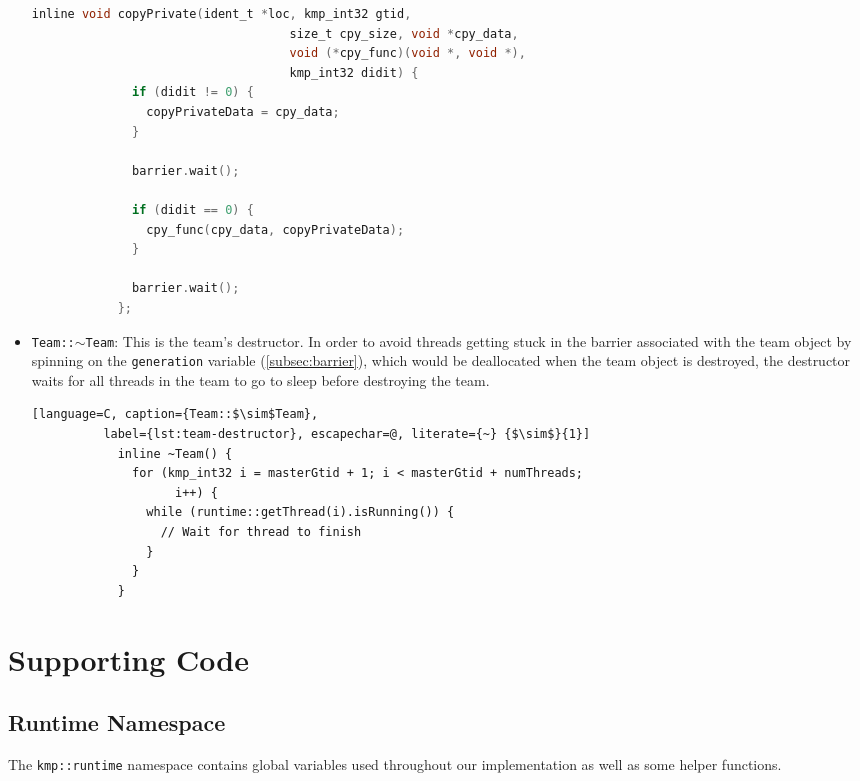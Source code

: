 \begin{itemize}
	      \begin{lstlisting}[language=C, caption={void Team::copyprivate},
          label={lst:team-copyprivate}, escapechar=@]
            inline void copyPrivate(ident_t *loc, kmp_int32 gtid,
                                    size_t cpy_size, void *cpy_data,
                                    void (*cpy_func)(void *, void *),
                                    kmp_int32 didit) {
              if (didit != 0) {
                copyPrivateData = cpy_data;
              }

              barrier.wait();

              if (didit == 0) {
                cpy_func(cpy_data, copyPrivateData);
              }

              barrier.wait();
            };
          \end{lstlisting}

	\item \texttt{Team::$\sim$Team}: This is the team's destructor. In order to avoid threads
	      getting stuck in the barrier associated with the team object by spinning on the
	      \texttt{generation} variable (\cref{subsec:barrier}), which would be deallocated when the team
	      object is destroyed, the destructor waits for all threads in the team to go to sleep before
	      destroying the team.

	      \begin{lstlisting}[language=C, caption={Team::$\sim$Team},
          label={lst:team-destructor}, escapechar=@, literate={~} {$\sim$}{1}]
            inline ~Team() {
              for (kmp_int32 i = masterGtid + 1; i < masterGtid + numThreads;
                    i++) {
                while (runtime::getThread(i).isRunning()) {
                  // Wait for thread to finish
                }
              }
            }
          \end{lstlisting}

\end{itemize}

\section{Supporting Code}
\label{sec:supporting-code}

\subsection{Runtime Namespace}

The \texttt{kmp::runtime} namespace contains global variables used throughout our implementation as
well as some helper functions.

